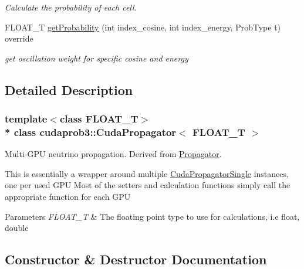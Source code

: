 \begin{DoxyCompactItemize}
\begin{DoxyCompactList}\small\item\em Calculate the probability of each cell. \end{DoxyCompactList}\item 
F\+L\+O\+A\+T\+\_\+T \hyperlink{classcudaprob3_1_1CudaPropagator_a3cde10f1ca21db8896420649dc5d4734}{get\+Probability} (int index\+\_\+cosine, int index\+\_\+energy, Prob\+Type t) override
\begin{DoxyCompactList}\small\item\em get oscillation weight for specific cosine and energy \end{DoxyCompactList}\end{DoxyCompactItemize}


\subsection{Detailed Description}
\subsubsection*{template$<$class F\+L\+O\+A\+T\+\_\+T$>$\\*
class cudaprob3\+::\+Cuda\+Propagator$<$ F\+L\+O\+A\+T\+\_\+\+T $>$}

Multi-\/\+G\+PU neutrino propagation. Derived from \hyperlink{classcudaprob3_1_1Propagator}{Propagator}. 

This is essentially a wrapper around multiple \hyperlink{classcudaprob3_1_1CudaPropagatorSingle}{Cuda\+Propagator\+Single} instances, one per used G\+PU Most of the setters and calculation functions simply call the appropriate function for each G\+PU 
\begin{DoxyParams}{Parameters}
{\em F\+L\+O\+A\+T\+\_\+T} & The floating point type to use for calculations, i.\+e float, double \\
\hline
\end{DoxyParams}


\subsection{Constructor \& Destructor Documentation}
